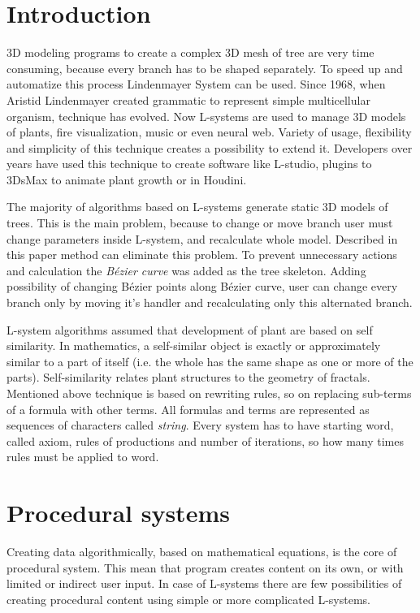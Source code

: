 \documentclass[b5paper,twoside,11pt]{article}
\begin{document}
\section{Introduction}
3D modeling programs to create a complex 3D mesh of tree are very time consuming, because every branch has to be shaped separately.
To speed up and automatize this process Lindenmayer System can be used. Since 1968, when Aristid Lindenmayer created  grammatic to represent simple multicellular organism, technique has evolved. Now L-systems are used to manage 3D models of plants\cite{Herbaceus, WebTree, Spray, wlosy, EnviroTree}, fire visualization\cite{Sim}, music\cite{MLSystem} or even neural web\cite{LBrain}. Variety of usage, flexibility and simplicity of this technique creates a possibility to extend it. Developers over years have used this technique to create software like L-studio\cite{L-Studio}, plugins to 3DsMax to animate plant growth\cite{ABartniak} or in Houdini\cite{LHoud}. 
\par The majority of algorithms based on L-systems generate static 3D models of trees. This is the main problem, because to change or move branch user must change parameters inside L-system, and recalculate whole model. Described in this paper method can eliminate this problem. To prevent unnecessary actions and calculation the \textit{Bézier curve} was added as the tree skeleton. Adding possibility of changing Bézier points along Bézier curve, user can change every branch only by moving it's handler and recalculating only this alternated branch. 
\par L-system algorithms assumed that development of plant are based on self similarity. In mathematics, a self-similar object is exactly or approximately similar to a part of itself (i.e. the whole has the same shape as one or more of the parts)\cite{SelfSimi}. Self-similarity relates plant structures to the geometry of fractals. Mentioned above technique is based on rewriting rules, so on replacing sub-terms of a formula with other terms. All formulas and terms are represented as sequences of characters called \textit{string}. Every system has to have starting word, called axiom, rules of productions and number of iterations, so how many times rules must be applied to word. 

\section{Procedural systems}
Creating data algorithmically, based on mathematical equations, is the core of procedural system. This mean that program creates content on its own, or with limited or indirect user input. In case of L-systems there are few possibilities of creating procedural content using simple or more complicated L-systems.
\end{document}
